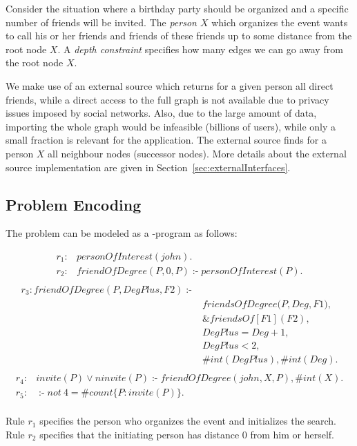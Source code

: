 \documentclass[a4paper, titlepage]{article}
\newcommand{\ext}[3]{\ensuremath{\&{#1}[#2](#3)}}
\DeclareMathOperator{\leftimpl}{:-}
\begin{document}
Consider the situation where a birthday party should be 
organized and a specific number of friends will be invited. 
The \emph{person $X$} which organizes the event wants to 
call his or her friends and friends of these friends up to 
some distance from the root node $X$. A \emph{depth 
constraint} specifies how many edges we can go away from 
the root node $X$.
 

We make use of an external source which returns for a given 
person all direct friends, while a direct access to the 
full graph is not available due to privacy issues imposed 
by social networks. Also, due to the large amount of data, 
importing the whole graph would be infeasible (billions of 
users), while only a small fraction is relevant for the 
application. The external source finds for a person $X$ all 
neighbour nodes (successor nodes). More details about the 
external source implementation are given in 
Section~\ref{sec:externalInterfaces}. 
               

\subsection{Problem Encoding}
The problem can be modeled as a \hex{}-program as follows:
\begin{exmp}
\label{faceQuery}
\begin{align*}
r_1\colon & \mathit{personOfInterest}(\mathit{john}). \\
r_2\colon & \mathit{friendOfDegree}(\mathit{P, 0, P}) 
\leftimpl  \mathit{personOfInterest}(P).\\
\end{align*}
\begin{align*}
r_{3}\colon \mathit{friendOfDegree}(\mathit{P, DegPlus, 
F2}) \leftimpl & \\  
& \mathit{friendsOfDegree}(\mathit{P,Deg,F1)},\\
& \ext{friendsOf}{F1}{F2},\\ 
& \mathit{DegPlus = Deg + 1}, \\
& \mathit{DegPlus < 2},\\
& \mathit{\#int(DegPlus)}, \mathit{\#int(Deg)}.\\
\end{align*}
\begin{align*}
r_{4}\colon & \mathit{invite(P)} \vee \mathit{ninvite(P) 
\leftimpl  friendOfDegree(john,X,P), \#int(X).}\\
r_{5}\colon & \leftimpl   \mathit{not} \ 4 = \mathit{\#count} 
\{ P : \mathit{invite(P)} \}. \\
\end{align*}
\end{exmp}
Rule $r_1$ specifies the person who organizes the event 
and initializes the search. Rule $r_2$ specifies that the initiating person has 
distance 0 from him or herself. 
\end{document}
